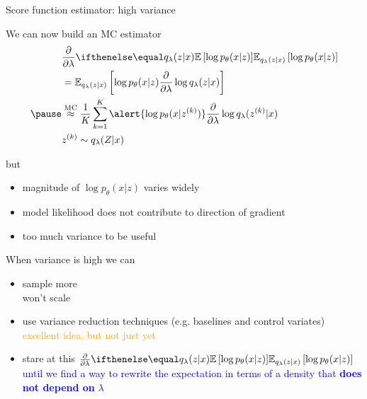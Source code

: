 \begin{frame}[plain]{Score function estimator: high variance}


We can now build an MC estimator
\begin{equation*}
\begin{aligned}
&\pdv{\lambda}\E[q_\lambda(z|x)]{\log p_\theta(x|z)} \\ 
&= \mathbb E_{q_\lambda(z|x)} \left[  \log p_\theta(x|z)  \pdv{\lambda}\log q_\lambda(z|x)\right] \\ \pause 
&\overset{\text{MC}}{\approx} \frac{1}{K} \sum_{k=1}^K \alert{\log p_\theta(x|z^{(k)})} \pdv{\lambda}\log q_\lambda(z^{(k)}|x) \\
&z^{(k)} \sim q_\lambda(Z|x)
\end{aligned}
\end{equation*}

\pause
but
\begin{itemize}
	\item magnitude of $\log p_\theta(x|z)$ varies widely \pause 
	\item model likelihood does not contribute to direction of gradient \pause
	\item too much variance to be useful
\end{itemize}

\end{frame}

\begin{frame}{When variance is high we can}

\begin{itemize}
	\item sample more \\ \pause
	\alert{won't scale} \pause
	\item use variance reduction techniques (e.g. baselines and control variates)\\ \pause 		\textcolor{orange}{excellent idea, but not just yet} \pause
	\item stare at this $\pdv{\lambda}\E[q_\lambda(z|x)]{\log p_\theta(x|z)}$ \\ \pause
	\textcolor{blue}{until we find a way to rewrite the expectation in terms of a density that 
	{\bf does not depend on} $\lambda$}
\end{itemize}
\end{frame}

